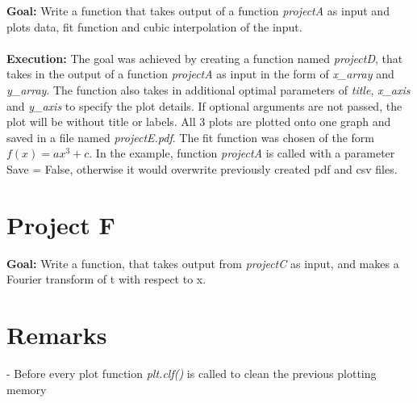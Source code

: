 \documentclass[a4paper,12pt]{article}
\begin{document}
\textbf{Goal:} Write a function that takes output of a function \textit{projectA} as input and plots data, fit function and cubic interpolation of the input. \\ \\ \textbf{Execution:} The goal was achieved by creating a function named \textit{projectD}, that takes in the output of a function \textit{projectA} as input in the form of \textit{x\_array} and \textit{y\_array}. The function also takes in additional optimal parameters of \textit{title}, \textit{x\_axis} and \textit{y\_axis} to specify the plot details. If optional arguments are not passed, the plot will be without title or labels. All 3 plots are plotted onto one graph and saved in a file named \textit{projectE.pdf}. The fit function was chosen of the form $f(x)=ax^{3}+c$. In the example, function \textit{projectA} is called with a parameter Save = False, otherwise it would overwrite previously created pdf and csv files. 

\section{Project F}

\textbf{Goal: } Write a function, that takes output from \textit{projectC} as input, and makes a Fourier transform of t with respect to x.

\section{Remarks}

- Before every plot function \textit{plt.clf()} is called to clean the previous plotting memory 
\end{document}
